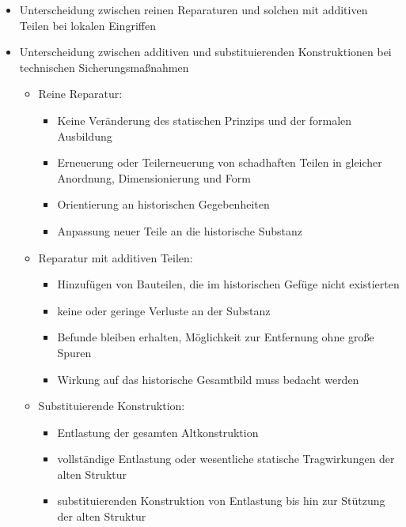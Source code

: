 \documentclass[fleqn,twoside]{article}
\begin{document}
       \begin{itemize}
        \item Unterscheidung zwischen reinen Reparaturen und solchen mit additiven Teilen bei lokalen Eingriffen
        \item Unterscheidung zwischen additiven und substituierenden Konstruktionen bei technischen Sicherungsmaßnahmen
            \begin{itemize}
                \item Reine Reparatur: 
                    \begin{itemize}
                        \item Keine Veränderung des statischen Prinzips und der formalen Ausbildung
                        \item Erneuerung oder Teilerneuerung von schadhaften Teilen in gleicher Anordnung, Dimensionierung und Form
                        \item Orientierung an historischen Gegebenheiten
                        \item Anpassung neuer Teile an die historische Substanz
                    \end{itemize}
                \item Reparatur mit additiven Teilen: 
                    \begin{itemize}
                        \item Hinzufügen von Bauteilen, die im historischen Gefüge nicht existierten
                        \item keine oder geringe Verluste an der Substanz
                        \item Befunde bleiben erhalten, Möglichkeit zur Entfernung ohne große Spuren
                        \item Wirkung auf das historische Gesamtbild muss bedacht werden
                    \end{itemize}
                \item Substituierende Konstruktion: 
                    \begin{itemize}
                        \item Entlastung der gesamten Altkonstruktion
                        \item vollständige Entlastung oder wesentliche statische Tragwirkungen der alten Struktur
                        \item substituierenden Konstruktion von Entlastung bis hin zur Stützung der alten Struktur
                    \end{itemize}

\end{itemize}
\end{itemize}
\end{document}
